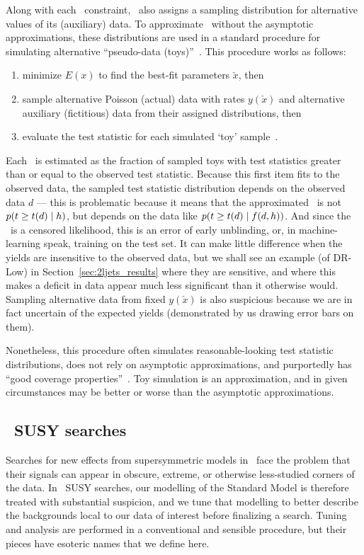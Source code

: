 Along with each \heplikelihood\ constraint, \histfactory\ also assigns a
sampling distribution for alternative values of its (auxiliary) data.
To approximate \pvalues\ without the asymptotic approximations,
these distributions are used in a standard procedure for simulating
alternative ``pseudo-data (toys)''~\cite{cern2011procedure}.
This procedure works as follows:
\begin{enumerate}
\item minimize $E(x)$ to find the best-fit parameters $\check{x}$, then
\item sample alternative Poisson (actual) data with rates $y(\check{x})$ and
alternative auxiliary (fictitious) data from their assigned distributions,
then
\item evaluate the test statistic for each simulated `toy'
sample~\cite{cern2011procedure}.
\end{enumerate}
Each \pvalue\ is estimated as the fraction of sampled toys with test statistics
greater than or equal to the observed test statistic.
Because this first item fits to the observed data, the sampled test statistic
distribution depends on the observed data $d$ ---
this is problematic because it means that the approximated \pvalue\ is not
$p(t \geq t(d) \mid h)$, but depends on the data like
$p(t \geq t(d) \mid f(d, h))$.
And since the \pvalue\ is a censored likelihood, this is an error of early
unblinding, or, in machine-learning speak, training on the test set.
It can make little difference when the yields are insensitive to the observed
data, but we shall see an example (of DR-Low) in
Section~\ref{sec:2ljets_results} where they are sensitive, and where
this makes a deficit in data appear much less significant than it  otherwise
would.
Sampling alternative data from fixed $y(\check{x})$ is also suspicious because
we are in fact uncertain of the expected yields
(demonstrated by us drawing error bars on them).

Nonetheless, this procedure often simulates reasonable-looking test statistic
distributions, does not rely on asymptotic approximations, and purportedly
has ``good coverage properties''~\cite{
cern2011procedure,
Cranmer2006Statistical
}.
Toy simulation is an approximation, and in given circumstances may be better or
worse than the asymptotic approximations.


\subsection{\atlas\ SUSY searches}
\label{sec:searches_searches}
Searches for new effects from supersymmetric models in \atlas\ face the problem
that their signals can appear in obscure, extreme, or otherwise less-studied
corners of the data.
In \atlas\ SUSY searches, our modelling of the  Standard Model is therefore
treated with substantial suspicion, and we tune that modelling to better
describe the backgrounds local to our data of interest before finalizing a
search.
Tuning and analysis are performed in a conventional and sensible procedure,
but their pieces have esoteric names that we define here.

